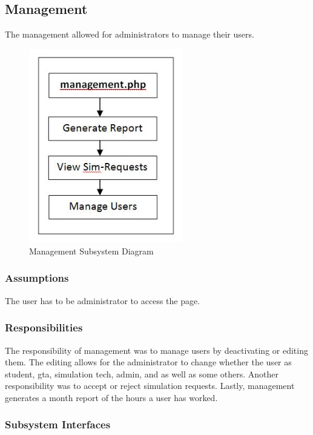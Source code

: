 \subsection{Management}
The management allowed for administrators to manage their users.

\begin{figure}[h!]
	\centering
 	\includegraphics[width=0.60\textwidth]{images/management}
 \caption{Management Subsystem Diagram}
\end{figure}

\subsubsection{Assumptions}
The user has to be administrator to access the page.


\subsubsection{Responsibilities}
The responsibility of management was to manage users by deactivating or editing them. The editing allows for the administrator to change whether the user as student, gta, simulation tech, admin, and as well as some others. Another responsibility was to accept or reject simulation requests. Lastly, management generates a month report of the hours a user has worked.

\subsubsection{Subsystem Interfaces}


